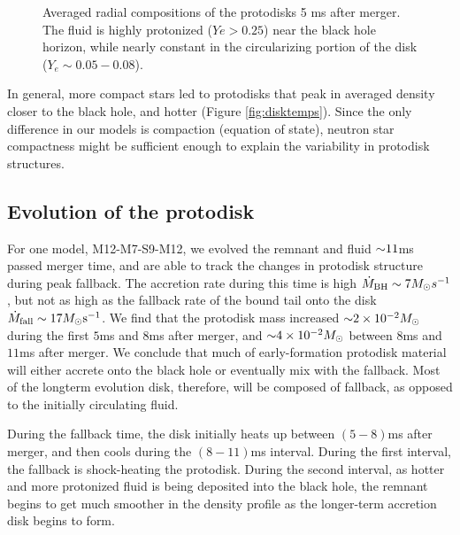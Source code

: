 \begin{figure}
	\centering
	
	\caption[Radial compositions of the protodisks 5 ms after merger]{
	Averaged radial compositions of the protodisks 5 ms after merger.  
	The fluid is highly protonized ($Ye > 0.25$) near the black hole horizon, while nearly constant in the circularizing portion of the disk ($Y_e \sim 0.05 - 0.08$).
	}
	\label{fig:diskYes}
\end{figure}

%	

In general, more compact stars led to protodisks that peak in averaged density closer to the black hole, and hotter (Figure \ref{fig:disktemps}).
Since the only difference in our models is compaction (equation of state),
neutron star compactness might be sufficient enough to explain the variability in protodisk structures. 

\subsection{Evolution of the protodisk}

For one model, M12-M7-S9-M12, we evolved the remnant and fluid $\mathord{\sim} 11$ms passed merger time, and are able to track the changes in protodisk structure during peak fallback.
The accretion rate during this time is high $\dot{M}_{\rm BH} \sim 7 M_\odot s^{-1}$, but not as high as the fallback rate of the bound tail onto the disk $\dot{M}_{\rm fall} \sim 17 M_\odot {\rm s}^{-1}$.
We find that the protodisk mass increased $\mathord{\sim} 2 \times 10^{-2} M_\odot$ during the first $5$ms and $8$ms after merger, and $\mathord{\sim}4 \times 10^{-2} M_\odot$ between $8$ms and $11$ms after merger.
We conclude that much of early-formation protodisk material will either accrete onto the black hole or eventually mix with the fallback.
Most of the longterm evolution disk, therefore, will be composed of fallback, as opposed to the initially circulating fluid.

During the fallback time, the disk initially heats up between $(5-8)$ms after merger, and then cools during the $(8-11)$ms interval. 
During the first interval, the fallback is shock-heating the protodisk.
During the second interval, 
as hotter and more protonized fluid is being deposited into the black hole,
the remnant begins to get much smoother in the density profile as the longer-term  accretion disk begins to form.

